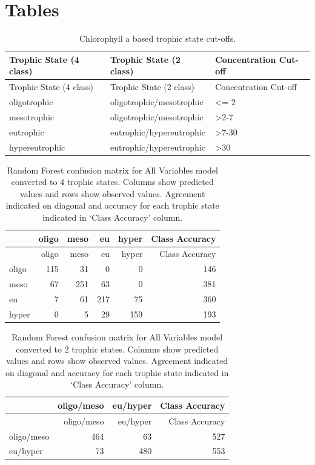 \documentclass[11pt,]{article}
\begin{document}
\newpage

\newpage

\newpage

\section{Tables}\label{tables}

\begin{longtable}[c]{@{}lll@{}}
\caption{Chlorophyll a based trophic state cut-offs.
\label{tab:trophicStateTable}}\tabularnewline
\toprule
Trophic State (4 class) & Trophic State (2 class) & Concentration
Cut-off\tabularnewline
\midrule
\endfirsthead
\toprule
Trophic State (4 class) & Trophic State (2 class) & Concentration
Cut-off\tabularnewline
\midrule
\endhead
oligotrophic & oligotrophic/mesotrophic & \textless{}= 2\tabularnewline
mesotrophic & oligotrophic/mesotrophic &
\textgreater{}2-7\tabularnewline
eutrophic & eutrophic/hypereutrophic & \textgreater{}7-30\tabularnewline
hypereutrophic & eutrophic/hypereutrophic &
\textgreater{}30\tabularnewline
\bottomrule
\end{longtable}

\newpage

\begin{longtable}[c]{@{}lrrrrr@{}}
\caption{Random Forest confusion matrix for All Variables model
converted to 4 trophic states. Columns show predicted values and rows
show observed values. Agreement indicated on diagonal and accuracy for
each trophic state indicated in `Class Accuracy' column.
\label{tab:Confusion_All_4}}\tabularnewline
\toprule
& oligo & meso & eu & hyper & Class Accuracy\tabularnewline
\midrule
\endfirsthead
\toprule
& oligo & meso & eu & hyper & Class Accuracy\tabularnewline
\midrule
\endhead
oligo & 115 & 31 & 0 & 0 & 146\tabularnewline
meso & 67 & 251 & 63 & 0 & 381\tabularnewline
eu & 7 & 61 & 217 & 75 & 360\tabularnewline
hyper & 0 & 5 & 29 & 159 & 193\tabularnewline
\bottomrule
\end{longtable}

\newpage

\begin{longtable}[c]{@{}lrrr@{}}
\caption{Random Forest confusion matrix for All Variables model
converted to 2 trophic states. Columns show predicted values and rows
show observed values. Agreement indicated on diagonal and accuracy for
each trophic state indicated in `Class Accuracy' column.
\label{tab:Confusion_All_2}}\tabularnewline
\toprule
& oligo/meso & eu/hyper & Class Accuracy\tabularnewline
\midrule
\endfirsthead
\toprule
& oligo/meso & eu/hyper & Class Accuracy\tabularnewline
\midrule
\endhead
oligo/meso & 464 & 63 & 527\tabularnewline
eu/hyper & 73 & 480 & 553\tabularnewline
\bottomrule
\end{longtable}
\end{document}
